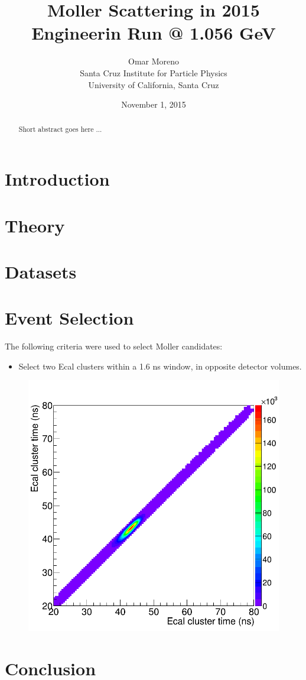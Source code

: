 \documentclass[twoside]{article}
\title{Moller Scattering in 2015 Engineerin Run @ 1.056 GeV}
\date{November 1, 2015}
\author{Omar Moreno \\
        Santa Cruz Institute for Particle Physics \\
        University of California, Santa Cruz
}
\begin{document}
    \maketitle

    \begin{abstract}
        Short abstract goes here ...
    \end{abstract}

    \section*{Introduction}

    \section*{Theory}

    \section*{Datasets}

    \section*{Event Selection}

        The following criteria were used to select Moller candidates: 
            \begin{itemize}
                \item Select two Ecal clusters within a 1.6 ns window, in opposite detector volumes.
            \end{itemize}
        
            \begin{figure}
                \includegraphics[width=.5\textwidth]{figures/20151102_cluster_pair_time.png}
            \end{figure}

    \section*{Conclusion}
\end{document}
